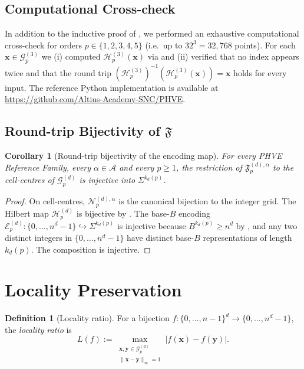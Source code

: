 \documentclass[11pt,a4paper]{article}
\theoremstyle{plain}
\newtheorem{corollary}[theorem]{Corollary}
\theoremstyle{definition}
\newtheorem{definition}[theorem]{Definition}
\theoremstyle{remark}
\newcommand{\Hil}{\mathcal{H}}
\newcommand{\Enc}{\mathcal{E}}
\newcommand{\Nor}{\mathcal{N}}
\newcommand{\Fc}{\mathfrak{F}}
\newcommand{\Grid}{\mathcal{G}}
\begin{document}
\subsection{Computational Cross-check}\label{sec:bij_3d_computational}

In addition to the inductive proof of , we performed an
exhaustive computational cross-check for orders $p\in\{1,2,3,4,5\}$
(i.e.\ up to $32^3 = 32{,}768$ points). For each
$\mathbf{x}\in\Grid_p^{(3)}$ we (i) computed $\Hil_p^{(3)}(\mathbf{x})$
via  and (ii) verified that no index appears
twice and that the round trip
$(\Hil_p^{(3)})^{-1}(\Hil_p^{(3)}(\mathbf{x}))=\mathbf{x}$ holds for
every input. The reference Python implementation is available at
\url{https://github.com/Altius-Academy-SNC/PHVE}.

\subsection{Round-trip Bijectivity of \texorpdfstring{$\Fc$}{F}}
\label{sec:bij_full}

\begin{corollary}[Round-trip bijectivity of the encoding map]
\label{cor:roundtrip}
For every PHVE Reference Family, every $\alpha\in\mathcal{A}$ and every
$p\geq 1$, the restriction of $\Fc_p^{(d),\alpha}$ to the cell-centres
of $\Grid_p^{(d)}$ is injective into $\Sigma^{k_d(p)}$.
\end{corollary}

\begin{proof}
On cell-centres, $\Nor_p^{(d),\alpha}$ is the canonical bijection
to the integer grid. The Hilbert map $\Hil_p^{(d)}$ is bijective by
. The base-$B$ encoding
$\Enc_p^{(d)}:\{0,\dots,n^d-1\}\hookrightarrow\Sigma^{k_d(p)}$ is
injective because $B^{k_d(p)}\geq n^d$ by , and any two
distinct integers in $\{0,\dots,n^d-1\}$ have distinct base-$B$
representations of length $k_d(p)$. The composition is injective.
\end{proof}

\section{Locality Preservation}\label{sec:locality}

\begin{definition}[Locality ratio]\label{def:locality}
For a bijection $f:\{0,\dots,n-1\}^d\to \{0,\dots,n^d-1\}$, the
\emph{locality ratio} is
\[
L(f) := \max_{\substack{\mathbf{x},\mathbf{y}\in\Grid_p^{(d)}\\
\|\mathbf{x}-\mathbf{y}\|_\infty=1}} |f(\mathbf{x})-f(\mathbf{y})|.
\]
\end{definition}
\end{document}
